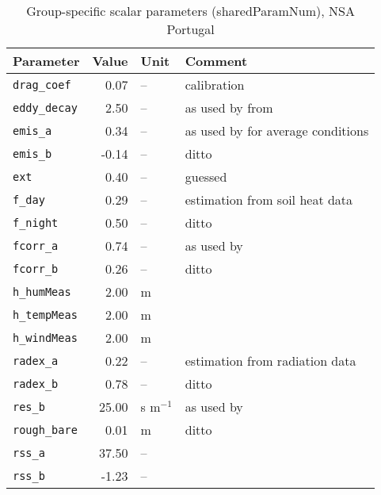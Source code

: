 \begin{table}[ht]
\centering
\caption{Group-specific scalar parameters (\textsf{sharedParamNum}), NSA Portugal} 
\label{tab:portugalNSA_sharedParamNum}
\begin{tabular}{lrll}
  \hline
Parameter & Value & Unit & Comment \\ 
  \hline
\verb!drag_coef! & 0.07 & -- & calibration \\ 
  \verb!eddy_decay! & 2.50 & -- & as used by \citet{shuttleworth85} from \citet{monteith73} \\ 
  \verb!emis_a! & 0.34 & -- & as used by \citet{maidment93} for average conditions \\ 
  \verb!emis_b! & -0.14 & -- & ditto \\ 
  \verb!ext! & 0.40 & -- & guessed \\ 
  \verb!f_day! & 0.29 & -- & estimation from soil heat data \\ 
  \verb!f_night! & 0.50 & -- & ditto \\ 
  \verb!fcorr_a! & 0.74 & -- & as used by \citet{maidment93} \\ 
  \verb!fcorr_b! & 0.26 & -- & ditto \\ 
  \verb!h_humMeas! & 2.00 & m &  \\ 
  \verb!h_tempMeas! & 2.00 & m &  \\ 
  \verb!h_windMeas! & 2.00 & m &  \\ 
  \verb!radex_a! & 0.22 & -- & estimation from radiation data \\ 
  \verb!radex_b! & 0.78 & -- & ditto \\ 
  \verb!res_b! & 25.00 & s m$^{-1}$ & as used by \citet{shuttleworth85} \\ 
  \verb!rough_bare! & 0.01 & m & ditto \\ 
  \verb!rss_a! & 37.50 & -- &  \\ 
  \verb!rss_b! & -1.23 & -- &  \\ 
   \hline
\end{tabular}
\end{table}
